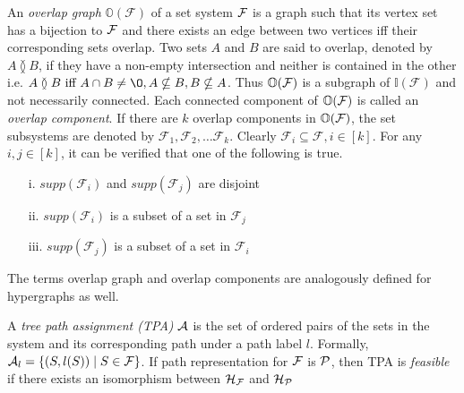 \documentclass{llncs}
\def\cA{{\cal A}}
\def\cF{{\cal F}}
\def\cP{{\cal P}}
\def\F{{\mathcal F}}
\def\A{{\mathcal A}}
\def\H{{\mathcal H}}
\def\bI{\mathbb I}
\def\bO{\mathbb O}
\def\overlap{\between}
\begin{document}
\noindent
An {\em overlap graph} $\bO(\F)$ of a set system $\cF$ is a graph such
that its vertex set has a bijection to $\cF$ and there exists an edge
between two vertices iff their corresponding sets overlap. Two sets
$A$ and $B$ are said to overlap, denoted by $A \overlap B$, if they
have a non-empty intersection and neither is contained in the other
i.e. $A \overlap B \text{ iff } A \cap B \ne \O, A \nsubseteq B, B
\nsubseteq A$. Thus $\bO(\cF)$ is a subgraph of $\bI(\F)$ and not
necessarily connected. Each connected component of $\bO(\cF)$ is
called an {\em overlap component}. If there are $k$ overlap components
in $\bO(\cF)$, the set subsystems are denoted by $\F_1, \F_2, \ldots
\F_k$. Clearly $\F_i \subseteq \F, i \in [k]$. For any $i, j \in [k]$,
it can be verified that one of the following is true.
\begin{enumerate}
\item[i.] $supp(\F_i)$ and $supp(\F_j)$ are disjoint
\item[ii.] $supp(\F_i)$ is a subset of a set in $\F_j$
\item[iii.] $supp(\F_j)$ is a subset of a set in $\F_i$\\
\end{enumerate}
 

The terms
overlap graph and overlap components are analogously defined for
hypergraphs as well. 


\noindent
A {\em tree path assignment (TPA)} $\cA$ is the set of ordered pairs of the
sets in the system and its corresponding path under a path label $l$.  Formally,
$\cA_l = \{(S, l(S)) \mid S \in \cF\}$. If path representation for
$\cF$ is $\cP$, then TPA is {\em feasible} if there exists an
isomorphism between $\H_\cF$ and $\H_\cP$



\end{document}
